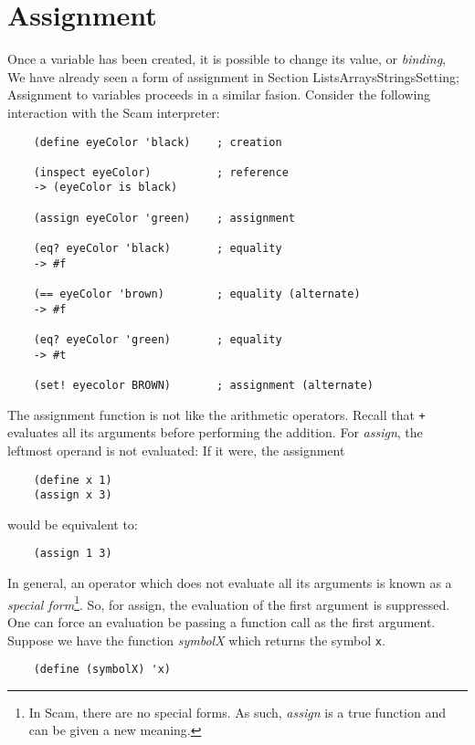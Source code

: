 \chapter{Assignment}
\label{Assignment}

Once a variable has been created, it is possible to change its value,
or {\it binding},
We have already seen a form of assignment in
Section {\link ListsArraysStringsSetting};
Assignment to variables proceeds in a similar fasion.
Consider the following interaction with
the Scam interpreter:

\begin{verbatim}
    (define eyeColor 'black)    ; creation
    
    (inspect eyeColor)          ; reference
    -> (eyeColor is black)
    
    (assign eyeColor 'green)    ; assignment
    
    (eq? eyeColor 'black)       ; equality
    -> #f
    
    (== eyeColor 'brown)        ; equality (alternate)
    -> #f

    (eq? eyeColor 'green)       ; equality
    -> #t

    (set! eyecolor BROWN)       ; assignment (alternate)
\end{verbatim}

The assignment function is not like the arithmetic operators.
Recall that {\tt +} evaluates all its arguments
before performing the addition.
For {\it assign},
the leftmost operand is not evaluated:
If it were, the assignment

\begin{verbatim}
    (define x 1)
    (assign x 3)
\end{verbatim}
    
would be equivalent to:

\begin{verbatim}
    (assign 1 3)
\end{verbatim}

In general, an operator which does not evaluate
all its arguments is known as a {\it special form}\footnote{
In Scam, there are no special forms. As such, {\it assign} is
a true function and can be given a new meaning.}.
So, for assign, the evaluation of the first argument
is suppressed. One can force an evaluation be
passing a function call as the first argument.
Suppose we have the function {\it symbolX} which returns
the symbol \verb!x!.

\begin{verbatim}
    (define (symbolX) 'x)
\end{verbatim}

